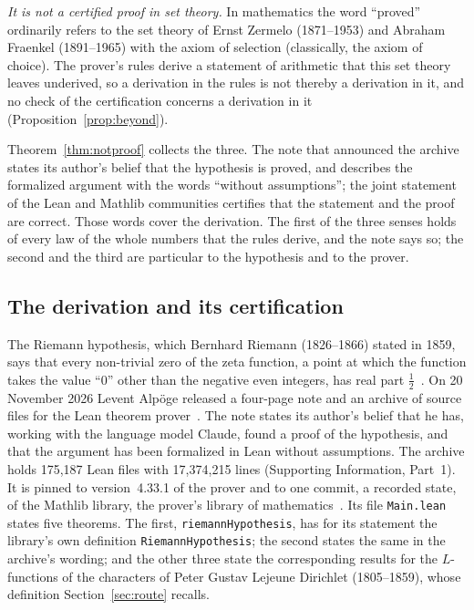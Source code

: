 \documentclass[11pt]{article}
\theoremstyle{definition}
\theoremstyle{remark}
\DeclareRobustCommand{\lean}[1]{{\renewcommand{\_}{\textunderscore\allowbreak}\texttt{#1}}}
\begin{document}
\emph{It is not a certified proof in set theory.} In mathematics the word ``proved'' ordinarily refers to the set theory of Ernst Zermelo (1871--1953) and Abraham Fraenkel (1891--1965) with the axiom of selection (classically, the axiom of choice). The prover's rules derive a statement of arithmetic that this set theory leaves underived, so a derivation in the rules is not thereby a derivation in it, and no check of the certification concerns a derivation in it (Proposition~\ref{prop:beyond}).

Theorem~\ref{thm:notproof} collects the three. The note that announced the archive states its author's belief that the hypothesis is proved, and describes the formalized argument with the words ``without assumptions''; the joint statement of the Lean and Mathlib communities certifies that the statement and the proof are correct. Those words cover the derivation. The first of the three senses holds of every law of the whole numbers that the rules derive, and the note says so; the second and the third are particular to the hypothesis and to the prover.

\subsection{The derivation and its certification}

The Riemann hypothesis, which Bernhard Riemann (1826--1866) stated in 1859, says that every non-trivial zero of the zeta function, a point at which the function takes the value ``0'' other than the negative even integers, has real part $\tfrac12$~\citep{riemann}. On 20 November 2026 Levent Alp\"oge released a four-page note and an archive of source files for the Lean theorem prover~\citep{alpoge,lean4}. The note states its author's belief that he has, working with the language model Claude, found a proof of the hypothesis, and that the argument has been formalized in Lean without assumptions. The archive holds 175{,}187 Lean files with 17{,}374{,}215 lines (Supporting Information, Part~1). It is pinned to version~4.33.1 of the prover and to one commit, a recorded state, of the Mathlib library, the prover's library of mathematics~\citep{mathlib}. Its file \lean{Main.lean} states five theorems. The first, \lean{riemannHypothesis}, has for its statement the library's own definition \lean{RiemannHypothesis}; the second states the same in the archive's wording; and the other three state the corresponding results for the $L$-functions of the characters of Peter Gustav Lejeune Dirichlet (1805--1859), whose definition Section~\ref{sec:route} recalls.
\end{document}
